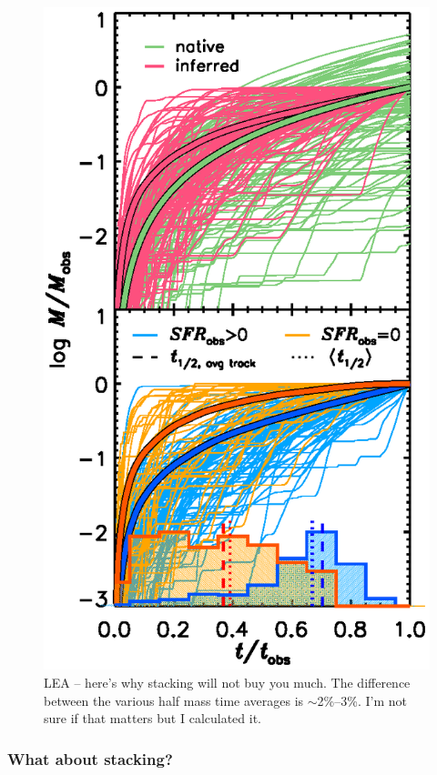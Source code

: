 \documentclass[a4paper,fleqn,usenatbib]{mnras}
\newcommand{\bfb}{\color{myblue}}
\begin{document}
\begin{figure}
\includegraphics[trim = 0cm 1cm 0cm 0cm]{noStackShowV}
\caption{\bfb LEA -- here's why stacking will not buy you much. The difference between
		the various half mass time averages is $\sim$2\%--3\%. I'm not sure if that matters
		but I calculated it.}
\label{fig:noStack}
\end{figure}

\subsubsection{What about stacking?}
\label{sec:stacking}
\end{document}
